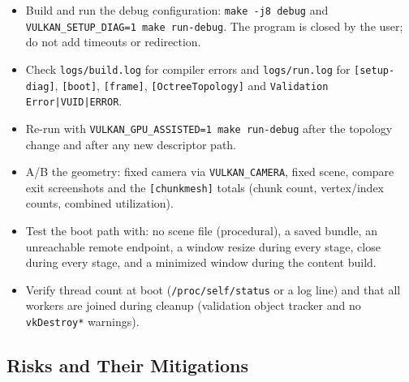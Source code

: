 \documentclass[11pt,a4paper]{article}
\begin{document}
\begin{itemize}[leftmargin=1.4em,itemsep=2pt]
\item Build and run the debug configuration:
\texttt{make -j8 debug} and \texttt{VULKAN\_SETUP\_DIAG=1 make run-debug}.
The program is closed by the user; do not add timeouts or redirection.
\item Check \texttt{logs/build.log} for compiler errors and
\texttt{logs/run.log} for \texttt{[setup-diag]}, \texttt{[boot]},
\texttt{[frame]}, \texttt{[OctreeTopology]} and
\texttt{Validation Error|VUID|ERROR}.
\item Re-run with \texttt{VULKAN\_GPU\_ASSISTED=1 make run-debug} after the
topology change and after any new descriptor path.
\item A/B the geometry: fixed camera via \texttt{VULKAN\_CAMERA}, fixed scene,
compare exit screenshots and the \texttt{[chunkmesh]} totals (chunk count,
vertex/index counts, combined utilization).
\item Test the boot path with: no scene file (procedural), a saved bundle,
an unreachable remote endpoint, a window resize during every stage, close
during every stage, and a minimized window during the content build.
\item Verify thread count at boot (\texttt{/proc/self/status} or a log line)
and that all workers are joined during cleanup (validation object tracker
and no \texttt{vkDestroy*} warnings).
\end{itemize}

\subsection{Risks and Their Mitigations}
\end{document}
